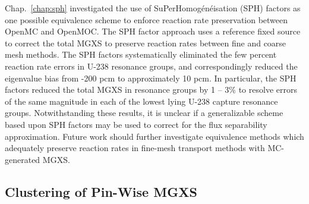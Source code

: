 Chap.~\ref{chap:sph} investigated the use of SuPerHomog\'{e}n\'{e}isation (SPH) factors as one possible equivalence scheme to enforce reaction rate preservation between OpenMC and OpenMOC. The \ac{SPH} factor approach uses a reference fixed source to correct the total \ac{MGXS} to preserve reaction rates between fine and coarse mesh methods. The \ac{SPH} factors systematically eliminated the few percent reaction rate errors in U-238 resonance groups, and correspondingly reduced the eigenvalue bias from -200 \ac{pcm} to approximately 10 \ac{pcm}. In particular, the \ac{SPH} factors reduced the total \ac{MGXS} in resonance groups by 1 -- 3\% to resolve errors of the same magnitude in each of the lowest lying U-238 capture resonance groups. Notwithstanding these results, it is unclear if a generalizable scheme based upon \ac{SPH} factors may be used to correct for the flux separability approximation. Future work should further investigate equivalence methods which adequately preserve reaction rates in fine-mesh transport methods with \ac{MC}-generated \ac{MGXS}.



\subsection{Clustering of Pin-Wise MGXS}
\label{subsec:chap12-mgxs-clustering}




